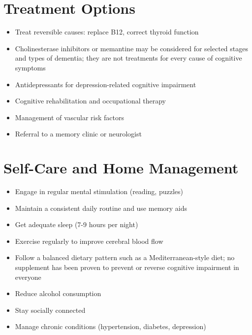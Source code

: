 \section*{Treatment Options}
\begin{itemize}
\item Treat reversible causes: replace B12, correct thyroid function
 \item Cholinesterase inhibitors or memantine may be considered for selected stages and types of dementia; they are not treatments for every cause of cognitive symptoms
\item Antidepressants for depression-related cognitive impairment
\item Cognitive rehabilitation and occupational therapy
\item Management of vascular risk factors
\item Referral to a memory clinic or neurologist
\end{itemize}
\section*{Self-Care and Home Management}
\begin{itemize}
\item Engage in regular mental stimulation (reading, puzzles)
\item Maintain a consistent daily routine and use memory aids
\item Get adequate sleep (7-9 hours per night)
\item Exercise regularly to improve cerebral blood flow
 \item Follow a balanced dietary pattern such as a Mediterranean-style diet; no supplement has been proven to prevent or reverse cognitive impairment in everyone
\item Reduce alcohol consumption
\item Stay socially connected
\item Manage chronic conditions (hypertension, diabetes, depression)
\end{itemize}

